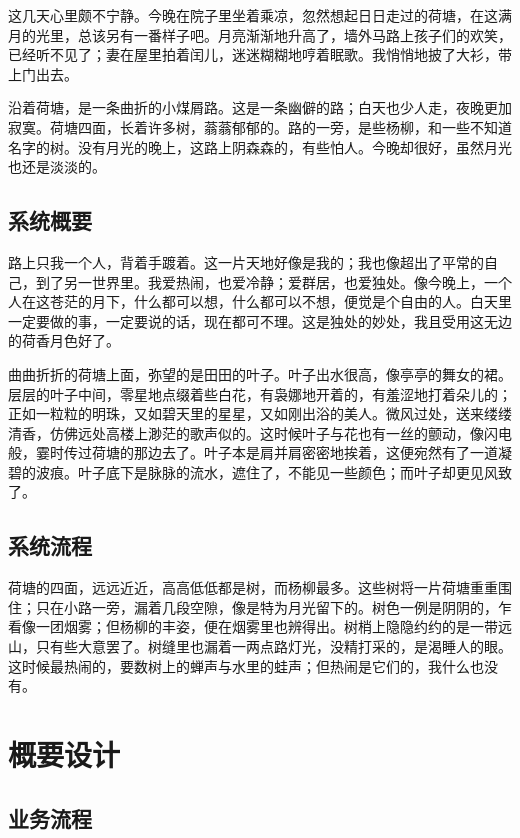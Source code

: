 \documentclass[printMode]{ecnuthesis}
\begin{document}
这几天心里颇不宁静。今晚在院子里坐着乘凉，忽然想起日日走过的荷塘，在这满月的光里，总该另有一番样子吧。月亮渐渐地升高了，墙外马路上孩子们的欢笑，已经听不见了；妻在屋里拍着闰儿，迷迷糊糊地哼着眠歌。我悄悄地披了大衫，带上门出去。

沿着荷塘，是一条曲折的小煤屑路。这是一条幽僻的路；白天也少人走，夜晚更加寂寞。荷塘四面，长着许多树，蓊蓊郁郁的。路的一旁，是些杨柳，和一些不知道名字的树。没有月光的晚上，这路上阴森森的，有些怕人。今晚却很好，虽然月光也还是淡淡的。

\section{系统概要}

路上只我一个人，背着手踱着。这一片天地好像是我的；我也像超出了平常的自己，到了另一世界里。我爱热闹，也爱冷静；爱群居，也爱独处。像今晚上，一个人在这苍茫的月下，什么都可以想，什么都可以不想，便觉是个自由的人。白天里一定要做的事，一定要说的话，现在都可不理。这是独处的妙处，我且受用这无边的荷香月色好了。

曲曲折折的荷塘上面，弥望的是田田的叶子。叶子出水很高，像亭亭的舞女的裙。层层的叶子中间，零星地点缀着些白花，有袅娜地开着的，有羞涩地打着朵儿的；正如一粒粒的明珠，又如碧天里的星星，又如刚出浴的美人。微风过处，送来缕缕清香，仿佛远处高楼上渺茫的歌声似的。这时候叶子与花也有一丝的颤动，像闪电般，霎时传过荷塘的那边去了。叶子本是肩并肩密密地挨着，这便宛然有了一道凝碧的波痕。叶子底下是脉脉的流水，遮住了，不能见一些颜色；而叶子却更见风致了。

\section{系统流程}

荷塘的四面，远远近近，高高低低都是树，而杨柳最多。这些树将一片荷塘重重围住；只在小路一旁，漏着几段空隙，像是特为月光留下的。树色一例是阴阴的，乍看像一团烟雾；但杨柳的丰姿，便在烟雾里也辨得出。树梢上隐隐约约的是一带远山，只有些大意罢了。树缝里也漏着一两点路灯光，没精打采的，是渴睡人的眼。这时候最热闹的，要数树上的蝉声与水里的蛙声；但热闹是它们的，我什么也没有。

\chapter{概要设计}

\section{业务流程}
\end{document}

